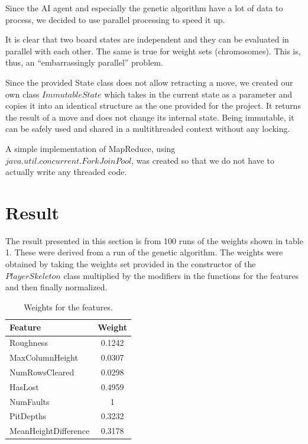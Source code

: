 \documentclass[twocolumn,12pt,journal,final]{IEEEtran_modified}
\begin{document}
Since the AI agent and especially the genetic algorithm have a lot of data to process, we decided to use parallel processing to speed it up.

It is clear that two board states are independent and they can be evaluated in parallel with each other. The same is true for weight sets (chromosomes). This is, thus, an “embarrassingly parallel” problem.

Since the provided State class does not allow retracting a move, we created our own class $ImmutableState$ which takes in the current state as a parameter and copies it into an identical structure as the one provided for the project. It returns the result of a move and does not change its internal state. Being immutable, it can be safely used and shared in a multithreaded context without any locking.

A simple implementation of MapReduce, using $java.util.concurrent.ForkJoinPool$, was created so that we do not have to actually write any threaded code.

\section{Result}
The result presented in this section is from 100 runs of the weights shown in table 1. These were derived from a run of the genetic algorithm. The weights were obtained by taking the weights set provided in the constructor of the $PlayerSkeleton$ class multiplied by the modifiers in the functions for the features and then finally normalized. 

\begin{table}[h!]
\normalsize
  \begin{center}
    \begin{tabular}{| l | c |}
    \hline
    \textbf{Feature} & \textbf{Weight} \\
    \hline
    Roughness & 0.1242  \\ \hline
    MaxColumnHeight & 0.0307  \\ \hline
    NumRowsCleared & 0.0298  \\ \hline
    HasLost & 0.4959  \\ \hline
    NumFaults & 1 \\ \hline
    PitDepths & 0.3232  \\ \hline
    MeanHeightDifference & 0.3178  \\ \hline

    \end{tabular}
  \end{center}
  \caption{Weights for the features.}
  \label{tab:weights}
\end{table}
\end{document}

